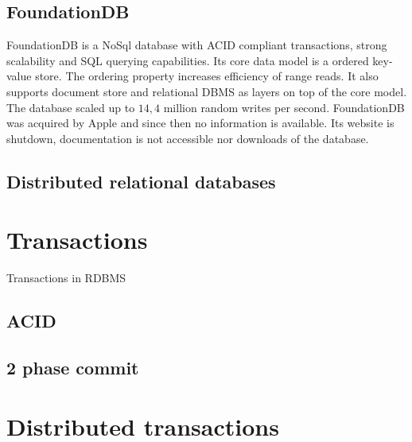 
\subsection{FoundationDB}
FoundationDB is a NoSql database with ACID compliant transactions, strong scalability and SQL querying capabilities.
Its core data model is a ordered key-value store. The ordering property increases efficiency of range reads. It also supports document store and relational DBMS as layers on top of the core model.  The database scaled up to $14,4$ million random writes per second. FoundationDB was acquired by Apple \cite{foundationDbAcquired} and since then no information is available. Its website is shutdown, documentation is not accessible nor downloads of the database.


\subsection{Distributed relational databases}






\section{Transactions}\label{sec:theory:transactions}
Transactions in RDBMS

\subsection{ACID}

\subsection{2 phase commit}

\section{Distributed transactions}


